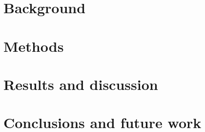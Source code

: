 \documentclass[a4paper,twocolumn,twoside]{article}
\begin{document}
	\section{Background}
	\label{Background}

	
	
	

	\section{Methods}
	\label{Methods}
	
	\section{Results and discussion}
	\label{Results and discussion}

	\section{Conclusions and future work}
	\label{Conclusions and future work}

	
		
	\clearpage 
\end{document}
